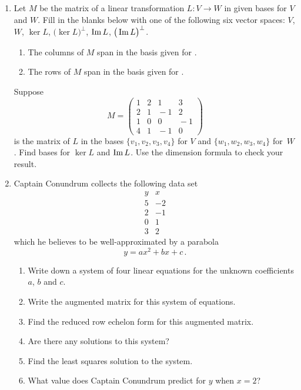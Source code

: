 \begin{enumerate}
\item Let $M$ be the matrix of a linear transformation $L:V\to W$ in given bases for $V$ and $W$.
Fill in the blanks below with one of the following six vector spaces: $V$, $W$, $\ker L$, 
$\big(\ker L\big)^\perp$, $\operatorname{Im} L$, $\big(\operatorname{Im} L\big)^\perp$.
\begin{enumerate}
\item The columns of $M$ span \underline{\phantom{answer}} in the basis given for \underline{\phantom{answer}}.
\item The rows of $M$ span \underline{\phantom{answer}} in the basis given for \underline{\phantom{answer}}.
\end{enumerate} 
Suppose \[M=\begin{pmatrix}1&2&1&3\\2&1&\!-1&2\\1&0&0&\!-1\\4&1&\!-1&0\end{pmatrix}\]
is the matrix of $L$ in the bases $\{v_1,v_2,v_3,v_4\}$ for $V$ and $\{w_1,w_2,w_3,w_4\}$ for~$W$.
Find bases for $\ker L$ and $\operatorname{Im} L$. Use the dimension formula to check your result.

\item
Captain Conundrum collects the following data set
\[
\begin{array}{c|c}
y&x\\
\hline
5&-2\\
2&-1\\
0&1\\
3&2
\end{array}
\]
which he believes to be well-approximated by a parabola
\[
y=ax^2+bx+c\, .
\]

\begin{enumerate}
\item Write down a system of four linear equations for the unknown coefficients $a$, $b$ and $c$.
\item Write the augmented matrix for this system of equations.
\item Find the reduced row echelon form for this augmented matrix.
\item Are there any solutions to this system?
\item Find the least squares solution to the system.
\item What value does Captain Conundrum predict for $y$ when $x=2$? 
\end{enumerate}



\end{enumerate}
